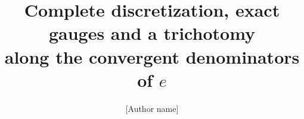 


\title{Complete discretization, exact gauges and a trichotomy\\along the convergent denominators of $e$}
\author{[Author name]\\ \relax[Affiliation]}
\date{}













